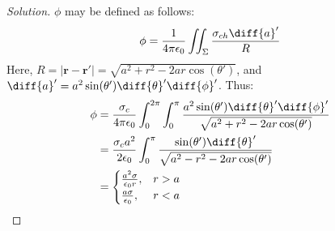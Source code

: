             \begin{proof}[Solution]
                $\phi$ may be defined as follows:
                \begin{equation}
                    \phi=\frac{1}{4\pi\epsilon_{0}}
                        \iint_{\Sigma}\frac{\sigma_{ch}\diff{a}'}{R}
                \end{equation}
                Here,
                $R=|\mathbf{r}-\mathbf{r}'|%
                 =\sqrt{a^2+r^2-2ar\cos(\theta')}$,
                and
                $\diff{a}'=%
                 a^2\sin(\theta')\diff{\theta}'\diff{\phi}'$.
                Thus:
                \begin{subequations}
                    \begin{align}
                        \phi&=\frac{\sigma_c}{4\pi\epsilon_0}
                            \int_{0}^{2\pi}\int_{0}^{\pi}
                        \frac{a^2\sin(\theta')\diff{\theta}'
                              \diff{\phi}'}
                             {\sqrt{a^2+r^2-2ar\cos(\theta')}}\\
                        &=\frac{\sigma_c a^2}{2\epsilon_0}
                            \int_{0}^{\pi}
                            \frac{\sin(\theta')\diff{\theta}'}
                                 {\sqrt{a^2-r^2-2ar\cos(\theta')}}\\
                        &=
                        \begin{cases}
                            \frac{a^{2}\sigma}{\epsilon_{0}r},
                                &r>a\\
                            \frac{a\sigma}{\epsilon_{0}},
                                &r<a
                        \end{cases}
                    \end{align}
                \end{subequations}
            \end{proof}
